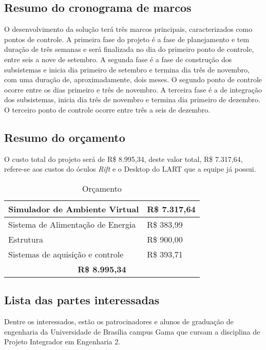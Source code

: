 \begin{apendicesenv}
\subsection{Resumo do cronograma de marcos}

O desenvolvimento da solução terá três marcos principais, caracterizados como pontos de controle. A primeira fase do projeto é a fase de planejamento e tem duração de três semanas e será finalizada no dia do primeiro ponto de controle, entre seis a nove de setembro. A segunda fase é a fase de construção dos subsistemas e inicia dia primeiro de setembro e termina dia três de novembro, com uma duração de, aproximadamente, dois meses. O segundo ponto de controle ocorre entre os dias primeiro e três de novembro. A terceira fase é a de integração dos subsistemas, inicia dia três de novembro e termina dia primeiro de dezembro. O terceiro ponto de controle ocorre entre três a seis de dezembro.

\subsection{Resumo do orçamento}

O custo total do projeto será de R\$ 8.995,34, deste valor total, R\$ 7.317,64, refere-se aos custos do óculos \textit{Rift} e o Desktop do LART que a equipe já possui.

\begin{table}[htp]
\centering
\caption{Orçamento}
\label{orcamento}
\begin{tabular}{|l|l|}
\hline
Simulador de Ambiente Virtual & R\$ 7.317,64 \\ \hline
Sistema de Alimentação de Energia & R\$ 383,99 \\ \hline
Estrutura & R\$ 900,00 \\ \hline
Sistemas de aquisição e controle & R\$ 393,71 \\ \hline
\multicolumn{2}{|c|}{\textbf{R\$ 8.995,34}} \\ \hline
\end{tabular}
\end{table}

\subsection{Lista das partes interessadas}

Dentre os interessados, estão os patrocinadores e alunos de graduação de engenharia da Universidade de Brasília campus Gama que cursam a disciplina de Projeto Integrador em Engenharia 2.


\end{apendicesenv}
